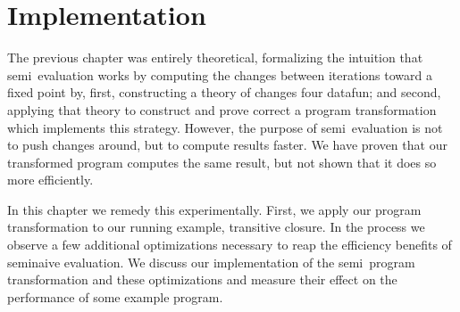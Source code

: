 \chapter{Implementation}

\newcommand\deep{\mathvar{dp}}

The previous chapter was entirely theoretical, formalizing the intuition that
semi\naive\ evaluation works by computing the changes between iterations toward
a fixed point by, first, constructing a theory of changes four datafun; and
second, applying that theory to construct and prove correct a program
transformation which implements this strategy. However, the purpose of
semi\naive\ evaluation is not to push changes around, but to compute results
faster. We have proven that our transformed program computes the same result,
but not shown that it does so more efficiently.

In this chapter we remedy this experimentally. First, we apply our program
transformation to our running example, transitive closure. In the process we
observe a few additional optimizations necessary to reap the efficiency
benefits of seminaive evaluation. We discuss our implementation of the
semi\naive\ program transformation and these optimizations and measure their
effect on the performance of some example program.




